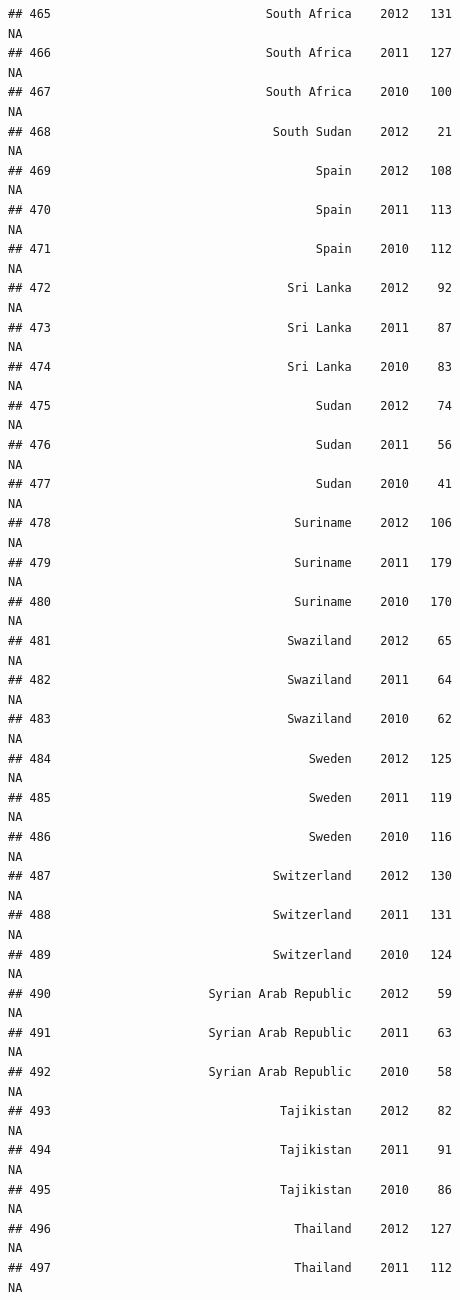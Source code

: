 \documentclass[
]{book}
\begin{document}
\begin{verbatim}
## 465                              South Africa    2012   131              NA
## 466                              South Africa    2011   127              NA
## 467                              South Africa    2010   100              NA
## 468                               South Sudan    2012    21              NA
## 469                                     Spain    2012   108              NA
## 470                                     Spain    2011   113              NA
## 471                                     Spain    2010   112              NA
## 472                                 Sri Lanka    2012    92              NA
## 473                                 Sri Lanka    2011    87              NA
## 474                                 Sri Lanka    2010    83              NA
## 475                                     Sudan    2012    74              NA
## 476                                     Sudan    2011    56              NA
## 477                                     Sudan    2010    41              NA
## 478                                  Suriname    2012   106              NA
## 479                                  Suriname    2011   179              NA
## 480                                  Suriname    2010   170              NA
## 481                                 Swaziland    2012    65              NA
## 482                                 Swaziland    2011    64              NA
## 483                                 Swaziland    2010    62              NA
## 484                                    Sweden    2012   125              NA
## 485                                    Sweden    2011   119              NA
## 486                                    Sweden    2010   116              NA
## 487                               Switzerland    2012   130              NA
## 488                               Switzerland    2011   131              NA
## 489                               Switzerland    2010   124              NA
## 490                      Syrian Arab Republic    2012    59              NA
## 491                      Syrian Arab Republic    2011    63              NA
## 492                      Syrian Arab Republic    2010    58              NA
## 493                                Tajikistan    2012    82              NA
## 494                                Tajikistan    2011    91              NA
## 495                                Tajikistan    2010    86              NA
## 496                                  Thailand    2012   127              NA
## 497                                  Thailand    2011   112              NA

\end{verbatim}
\end{document}

